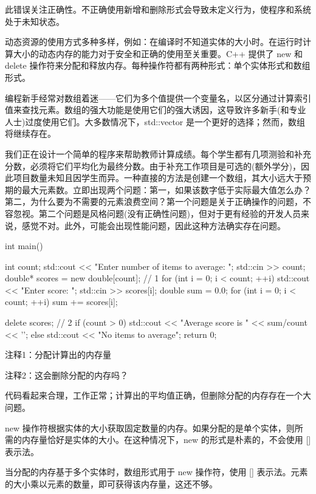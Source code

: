 此错误关注正确性。不正确使用新增和删除形式会导致未定义行为，使程序和系统处于未知状态。

动态资源的使用方式多种多样，例如：在编译时不知道实体的大小时。在运行时计算大小的动态内存的能力对于安全和正确的使用至关重要。C++ 提供了 new 和 delete 操作符来分配和释放内存。每种操作符都有两种形式：单个实体形式和数组形式。


编程新手经常对数组着迷——它们为多个值提供一个变量名，以区分通过计算索引值来查找元素。数组的强大功能是使用它们的强大诱因，这导致许多新手(和专业人士)过度使用它们。大多数情况下，std::vector 是一个更好的选择；然而，数组将继续存在。

我们正在设计一个简单的程序来帮助教师计算成绩。每个学生都有几项测验和补充分数，必须将它们平均化为最终分数。由于补充工作项目是可选的(额外学分)，因此项目数量未知且因学生而异。一种直接的方法是创建一个数组，其大小远大于预期的最大元素数。立即出现两个问题：第一，如果该数字低于实际最大值怎么办？第二，为什么要为不需要的元素浪费空间？第一个问题是关于正确操作的问题，不容忽视。第二个问题是风格问题(没有正确性问题)，但对于更有经验的开发人员来说，感觉不对。此外，可能会出现性能问题，因此这种方法确实存在问题。


\begin{cpp}
int main() {
  int count;
  std::cout << "Enter number of items to average: ";
  std::cin >> count;
  double* scores = new double[count]; // 1
  for (int i = 0; i < count; ++i) {
    std::cout << "Enter score: ";
    std::cin >> scores[i];
  }
  double sum = 0.0;
  for (int i = 0; i < count; ++i)
    sum += scores[i];

  delete scores; // 2
  if (count > 0)
    std::cout << "Average score is " << sum/count << '\n';
  else
    std::cout << "No items to average\n";
  return 0;
}
\end{cpp}

{\footnotesize
注释1：分配计算出的内存量

注释2：这会删除分配的内存吗？
}


代码看起来合理，工作正常；计算出的平均值正确，但删除分配的内存存在一个大问题。

new 操作符根据实体的大小获取固定数量的内存。如果分配的是单个实体，则所需的内存量恰好是实体的大小。在这种情况下，new 的形式是朴素的，不会使用 [] 表示法。

当分配的内存基于多个实体时，数组形式用于 new 操作符，使用 [] 表示法。元素的大小乘以元素的数量，即可获得该内存量，这还不够。

